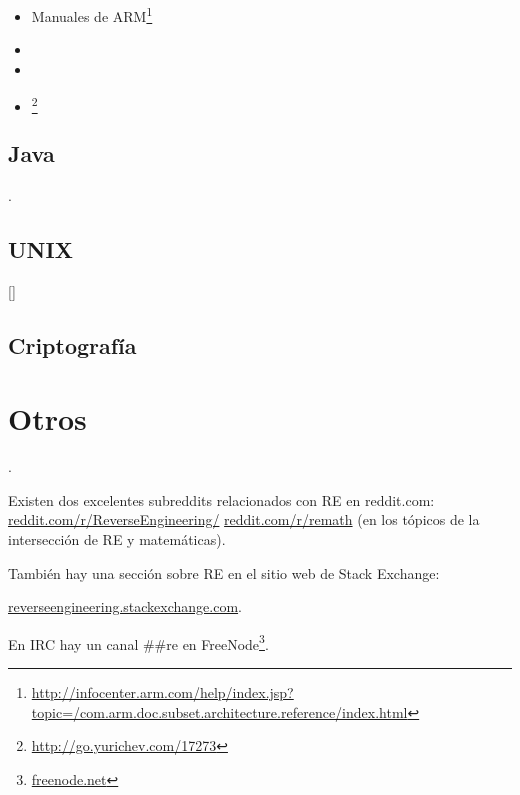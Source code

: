 \begin{itemize}
\item Manuales de ARM\footnote{\AlsoAvailableAs \url{http://infocenter.arm.com/help/index.jsp?topic=/com.arm.doc.subset.architecture.reference/index.html}}

\item \ARMSevenRef

\item \ARMSixFourRefURL

\item \ARMCookBook\footnote{\AlsoAvailableAs \url{http://go.yurichev.com/17273}}
\end{itemize}

\subsection{Java}

\JavaBook.

\subsection{UNIX}

[\TAOUP]

\subsection{Criptograf\'ia}



\section{Otros}

\HenryWarren.

Existen dos excelentes subreddits relacionados con \ac{RE} en reddit.com:
\href{http://go.yurichev.com/17027}{reddit.com/r/ReverseEngineering/} \ESph{}
\href{http://go.yurichev.com/17028}{reddit.com/r/remath}
(en los t\'opicos de la intersecci\'on de \ac{RE} y matem\'aticas).

Tambi\'en hay una secci\'on sobre \ac{RE} en el sitio web de Stack Exchange:

\par
\href{http://go.yurichev.com/17029}{reverseengineering.stackexchange.com}.

En IRC hay un canal \#\#re en
FreeNode\footnote{\href{http://go.yurichev.com/17030}{freenode.net}}.

